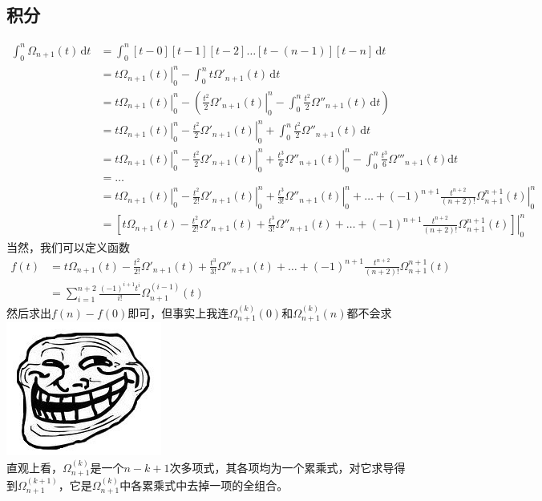 \documentclass{article}
\begin{document}
\begin{CJK*}{UTF8}{gbsn}
\section{积分}
\[
\begin{aligned}
\int_0^n \! \Omega_{n + 1}(t) \, \mathrm{d}t
&= \int_0^n \! [t - 0][t - 1][t - 2] \ldots [t - (n - 1)][t - n] \, \mathrm{d}t \\
&= \left.t\Omega_{n + 1}(t) \right|_0^n - \int_0^n \! t\Omega'_{n + 1}(t) \, \mathrm{d}t \\
&= \left.t\Omega_{n + 1}(t) \right|_0^n - \left( {\left.{\frac{t^2}{2}\Omega'_{n + 1}(t)} \right|_0^n - \int_0^n \! \frac{t^2}{2}\Omega''_{n + 1}(t) \, \mathrm{d}t} \right) \\
&= \left.t\Omega_{n + 1}(t) \right|_0^n - \left.\frac{t^2}{2}\Omega'_{n + 1}(t) \right|_0^n + \int_0^n \! \frac{t^2}{2}\Omega''_{n + 1}(t) \, \mathrm{d}t \\
&= \left.t\Omega_{n + 1}(t) \right|_0^n - \left.\frac{t^2}{2}\Omega'_{n + 1}(t) \right|_0^n + \left.\frac{t^3}{6}\Omega''_{n + 1}(t) \right|_0^n - \int_0^n \! \frac{t^3}{6}\Omega'''_{n + 1}(t) \mathrm{d}t \\
&= \ldots \\
&= \left.t\Omega_{n + 1}(t) \right|_0^n - \left.\frac{t^2}{2!}\Omega'_{n + 1}(t) \right|_0^n + \left.\frac{t^3}{3!}\Omega''_{n + 1}(t) \right|_0^n + \ldots + \left.(-1)^{n + 1}\frac{t^{n + 2}}{(n + 2)!}\Omega^{n + 1}_{n + 1}(t) \right|_0^n \\
&= \left.\left[ t\Omega_{n + 1}(t) - \frac{t^2}{2!}\Omega'_{n + 1}(t) + \frac{t^3}{3!}\Omega''_{n + 1}(t) + \ldots + (-1)^{n + 1}\frac{t^{n + 2}}{(n + 2)!}\Omega^{n + 1}_{n + 1}(t) \right] \right|_0^n
\end{aligned}
\]
当然，我们可以定义函数
\[
\begin{aligned}
f(t)
&= t\Omega_{n + 1}(t) - \frac{t^2}{2!}\Omega'_{n + 1}(t) + \frac{t^3}{3!}\Omega''_{n + 1}(t) + \ldots + (-1)^{n + 1}\frac{t^{n + 2}}{(n + 2)!}\Omega^{n + 1}_{n + 1}(t) \\
&= \sum_{i = 1}^{n + 2} \frac{(-1)^{i + 1}t^i}{i!} \Omega_{n + 1}^{(i - 1)}(t)
\end{aligned}
\]
然后求出$f(n) - f(0)$即可，但事实上我连$\Omega_{n + 1}^{(k)}(0)$和$\Omega_{n + 1}^{(k)}(n)$都不会求
\includegraphics[scale = 0.3]{bm42.jpg} \\
直观上看，$\Omega_{n + 1}^{(k)}$是一个$n - k + 1$次多项式，其各项均为一个累乘式，对它求导得到$\Omega_{n + 1}^{(k + 1)}$，它是$\Omega_{n + 1}^{(k)}$中各累乘式中去掉一项的全组合。

\end{CJK*}
\end{document}

